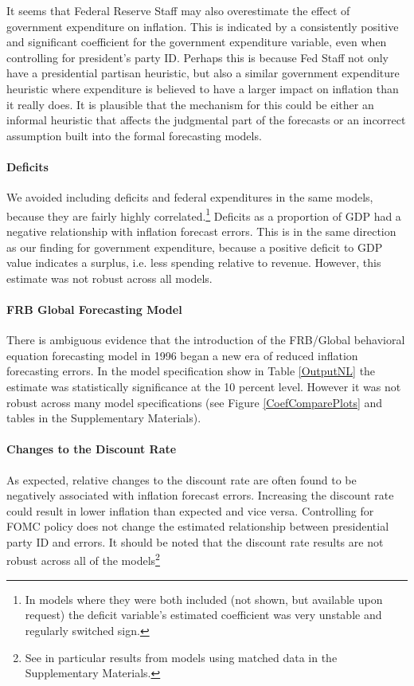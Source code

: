 \documentclass[a4paper]{article}\usepackage[]{graphicx}\usepackage[]{color}
\begin{document}
It seems that Federal Reserve Staff may also overestimate the effect of government expenditure on inflation. This is indicated by a consistently positive and significant coefficient for the government expenditure variable, even when controlling for president's party ID. Perhaps this is because Fed Staff not only have a presidential partisan heuristic, but also a similar government expenditure heuristic where expenditure is believed to have a larger impact on inflation than it really does. It is plausible that the mechanism for this could be either an informal heuristic that affects the judgmental part of the forecasts or an incorrect assumption built into the formal forecasting models.

\paragraph{Deficits} We avoided including deficits and federal expenditures in the same models, because they are fairly highly correlated.\footnote{In models where they were both included (not shown, but available upon request) the deficit variable's estimated coefficient was very unstable and regularly switched sign.} Deficits as a proportion of GDP had a negative relationship with inflation forecast errors. This is in the same direction as our finding for government expenditure, because a positive deficit to GDP value indicates a surplus, i.e. less spending relative to revenue. However, this estimate was not robust across all models.

\paragraph{FRB Global Forecasting Model}

There is ambiguous evidence that the introduction of the FRB/Global behavioral equation forecasting model in 1996 began a new era of reduced inflation forecasting errors. In the model specification show in Table \ref{OutputNL} the estimate was statistically significance at the 10 percent level. However it was not robust across many model specifications (see Figure \ref{CoefComparePlots} and tables in the Supplementary Materials).

\paragraph{Changes to the Discount Rate}

As expected, relative changes to the discount rate are often found to be negatively associated with inflation forecast errors. Increasing the discount rate could result in lower inflation than expected and vice versa. Controlling for FOMC policy does not change the estimated relationship between presidential party ID and errors. It should be noted that the discount rate results are not robust across all of the models\footnote{See in particular results from models using matched data in the Supplementary Materials.} 
\end{document}
